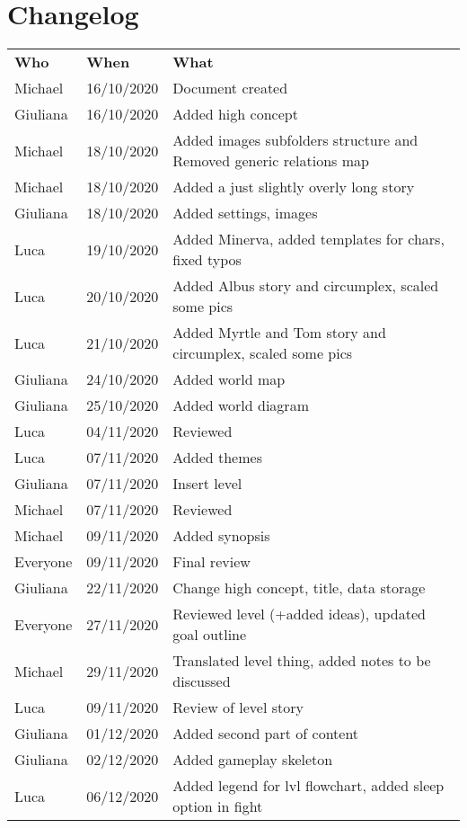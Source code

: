\section{Changelog}


\begin{longtable}{ m{2cm}m{3cm}m{8cm}} 
\centering 
 \textbf{Who}& \textbf{When} & \textbf{What}\\
Michael  & 16/10/2020 & Document created \\
Giuliana & 16/10/2020 & Added high concept \\
Michael  & 18/10/2020 & Added images subfolders structure and Removed generic relations map \\
Michael  & 18/10/2020 & Added a just slightly overly long story \\
Giuliana & 18/10/2020 & Added settings, images \\
Luca     & 19/10/2020 & Added Minerva, added templates for chars, fixed typos  \\
Luca     & 20/10/2020 & Added Albus story and circumplex, scaled some pics \\
Luca     & 21/10/2020 & Added Myrtle and Tom story and circumplex, scaled some pics \\
Giuliana & 24/10/2020 & Added world map \\
Giuliana & 25/10/2020 & Added world diagram \\
Luca     & 04/11/2020 & Reviewed \\
Luca     & 07/11/2020 & Added themes \\
Giuliana & 07/11/2020 & Insert level \\
Michael  & 07/11/2020 & Reviewed \\
Michael  & 09/11/2020 & Added synopsis \\
Everyone & 09/11/2020 & Final review \\
Giuliana & 22/11/2020 & Change high concept, title, data storage \\
Everyone & 27/11/2020 & Reviewed level (+added ideas), updated goal outline \\
Michael  & 29/11/2020 & Translated level thing, added notes to be discussed\\
Luca     & 09/11/2020 & Review of level story\\
Giuliana & 01/12/2020 & Added second part of content\\
Giuliana & 02/12/2020 & Added gameplay skeleton\\
Luca     & 06/12/2020 & Added legend for lvl flowchart, added sleep option in fight \\

\end{longtable}
